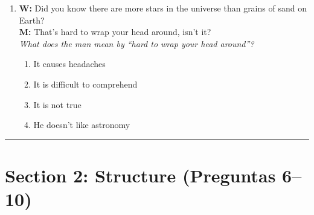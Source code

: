 \documentclass[10pt,a4paper]{article}
\begin{document}
\begin{enumerate}[leftmargin=*, label=\textbf{\arabic*.}]
\item \textbf{W:} Did you know there are more stars in the
universe than grains of sand on Earth?\\
\textbf{M:} That's hard to wrap your head around, isn't it?\\[3pt]
\textit{What does the man mean by ``hard to wrap your head around''?}
\begin{enumerate}[label=(\Alph*)]
  \item It causes headaches
  \item It is difficult to comprehend
  \item It is not true
  \item He doesn't like astronomy
\end{enumerate}

\end{enumerate}

\vspace{6pt}
\rule{\textwidth}{0.4pt}

\section*{Section 2: Structure (Preguntas 6--10)}
\end{document}
